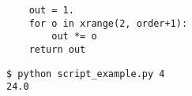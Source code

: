 \begin{Verbatim}
    out = 1.
    for o in xrange(2, order+1):
        out *= o
    return out 
\end{Verbatim}
\begin{Verbatim}
$ python script_example.py 4
24.0
\end{Verbatim}
